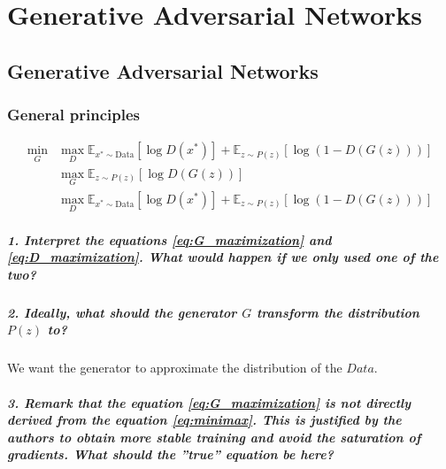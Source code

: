 \chapter{Generative Adversarial Networks}
\graphicspath{{figs/2de/}}


\section{Generative Adversarial Networks}


\subsection{General principles}

\begin{align}
    \min_{G} &\max_{D} \mathbb{E}_{x^* \sim \text{Data}} \left[ \log D(x^*) \right] + \mathbb{E}_{z \sim P(z)} \left[ \log (1 - D(G(z))) \right] \label{eq:minimax} \\
    &\max_{G} \mathbb{E}_{z \sim P(z)} \left[ \log D(G(z)) \right] \label{eq:G_maximization} \\
    &\max_{D} \mathbb{E}_{x^* \sim \text{Data}} \left[ \log D(x^*) \right] + \mathbb{E}_{z \sim P(z)} \left[ \log (1 - D(G(z))) \right] \label{eq:D_maximization}
\end{align}
    
\paragraph*{1. Interpret the equations \ref{eq:G_maximization} and \ref{eq:D_maximization}. What would happen if we only used one of the two?}

\paragraph*{2. Ideally, what should the generator $G$ transform the distribution $P(z)$ to?}
We want the generator to approximate the distribution of the $Data$.
\paragraph*{3. Remark that the equation \ref{eq:G_maximization} is not directly derived from the equation \ref{eq:minimax}. This is justified by the authors to obtain more stable training and avoid the saturation of gradients. What should the ''true'' equation be here?}

